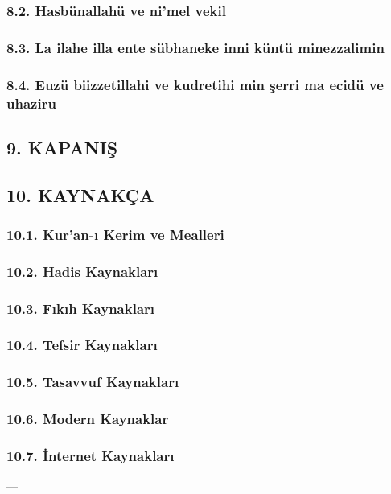 \documentclass[12pt,a4paper]{article}
\begin{document}
\subsubsection{8.2. Hasbünallahü ve ni'mel vekil}
\subsubsection{8.3. La ilahe illa ente sübhaneke inni küntü minezzalimin}
\subsubsection{8.4. Euzü biizzetillahi ve kudretihi min şerri ma ecidü ve uhaziru}
\subsection{9. KAPANIŞ}
\subsection{10. KAYNAKÇA}
\subsubsection{10.1. Kur'an-ı Kerim ve Mealleri}
\subsubsection{10.2. Hadis Kaynakları}
\subsubsection{10.3. Fıkıh Kaynakları}
\subsubsection{10.4. Tefsir Kaynakları}
\subsubsection{10.5. Tasavvuf Kaynakları}
\subsubsection{10.6. Modern Kaynaklar}
\subsubsection{10.7. İnternet Kaynakları}
---
\end{document}
